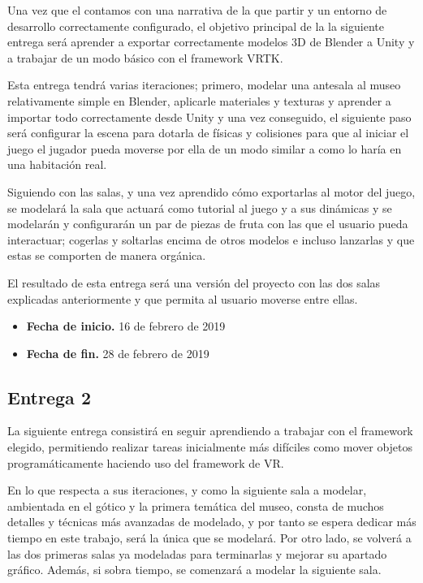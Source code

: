 Una vez que el contamos con una narrativa de la que partir y un entorno de desarrollo correctamente configurado, el objetivo principal de la la siguiente entrega será aprender a exportar correctamente modelos 3D de Blender a Unity y a trabajar de un modo básico con el framework \acs{VRTK}.

Esta entrega tendrá varias iteraciones; primero, modelar una antesala al museo relativamente simple en Blender, aplicarle materiales y texturas y aprender a importar todo correctamente desde Unity y una vez conseguido, el siguiente paso será configurar la escena para dotarla de físicas y colisiones para que al iniciar el juego el jugador pueda moverse por ella de un modo similar a como lo haría en una habitación real.

Siguiendo con las salas, y una vez aprendido cómo exportarlas al motor del juego, se modelará la sala que actuará como tutorial al juego y a sus dinámicas y se modelarán y configurarán un par de piezas de fruta con las que el usuario pueda interactuar; cogerlas y soltarlas encima de otros modelos e incluso lanzarlas y que estas se comporten de manera orgánica.

El resultado de esta entrega será una versión del proyecto con las dos salas explicadas anteriormente y que permita al usuario moverse entre ellas.

\begin{itemize}
    \item \textbf{Fecha de inicio.} 16 de febrero de 2019
    \item \textbf{Fecha de fin.} 28 de febrero de 2019
\end{itemize}

\subsection{Entrega 2}

La siguiente entrega consistirá en seguir aprendiendo a trabajar con el framework elegido, permitiendo realizar tareas inicialmente más difíciles como mover objetos programáticamente haciendo uso del framework de \acs{VR}.

En lo que respecta a sus iteraciones, y como la siguiente sala a modelar, ambientada en el gótico y la primera temática del museo, consta de muchos detalles y técnicas más avanzadas de modelado, y por tanto se espera dedicar más tiempo en este trabajo, será la única que se modelará. Por otro lado, se volverá a las dos primeras salas ya modeladas para terminarlas y mejorar su apartado gráfico. Además, si sobra tiempo, se comenzará a modelar la siguiente sala.

